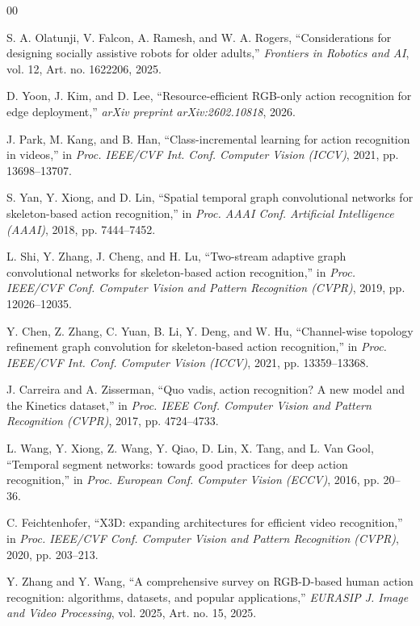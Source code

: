 \documentclass[conference]{IEEEtran}
\begin{document}
\begin{thebibliography}{00}

S. A. Olatunji, V. Falcon, A. Ramesh, and W. A. Rogers,
``Considerations for designing socially assistive robots for older adults,''
\textit{Frontiers in Robotics and AI}, vol. 12, Art. no. 1622206, 2025.

D. Yoon, J. Kim, and D. Lee,
``Resource-efficient RGB-only action recognition for edge deployment,''
\textit{arXiv preprint arXiv:2602.10818}, 2026.

J. Park, M. Kang, and B. Han,
``Class-incremental learning for action recognition in videos,''
in \textit{Proc. IEEE/CVF Int. Conf. Computer Vision (ICCV)}, 2021, pp. 13698--13707.

S. Yan, Y. Xiong, and D. Lin,
``Spatial temporal graph convolutional networks for skeleton-based action recognition,''
in \textit{Proc. AAAI Conf. Artificial Intelligence (AAAI)}, 2018, pp. 7444--7452.

L. Shi, Y. Zhang, J. Cheng, and H. Lu,
``Two-stream adaptive graph convolutional networks for skeleton-based action recognition,''
in \textit{Proc. IEEE/CVF Conf. Computer Vision and Pattern Recognition (CVPR)}, 2019, pp. 12026--12035.

Y. Chen, Z. Zhang, C. Yuan, B. Li, Y. Deng, and W. Hu,
``Channel-wise topology refinement graph convolution for skeleton-based action recognition,''
in \textit{Proc. IEEE/CVF Int. Conf. Computer Vision (ICCV)}, 2021, pp. 13359--13368.

J. Carreira and A. Zisserman,
``Quo vadis, action recognition? A new model and the Kinetics dataset,''
in \textit{Proc. IEEE Conf. Computer Vision and Pattern Recognition (CVPR)}, 2017, pp. 4724--4733.

L. Wang, Y. Xiong, Z. Wang, Y. Qiao, D. Lin, X. Tang, and L. Van Gool,
``Temporal segment networks: towards good practices for deep action recognition,''
in \textit{Proc. European Conf. Computer Vision (ECCV)}, 2016, pp. 20--36.

C. Feichtenhofer,
``X3D: expanding architectures for efficient video recognition,''
in \textit{Proc. IEEE/CVF Conf. Computer Vision and Pattern Recognition (CVPR)}, 2020, pp. 203--213.

Y. Zhang and Y. Wang,
``A comprehensive survey on RGB-D-based human action recognition: algorithms, datasets, and popular applications,''
\textit{EURASIP J. Image and Video Processing}, vol. 2025, Art. no. 15, 2025.


\end{thebibliography}
\end{document}

